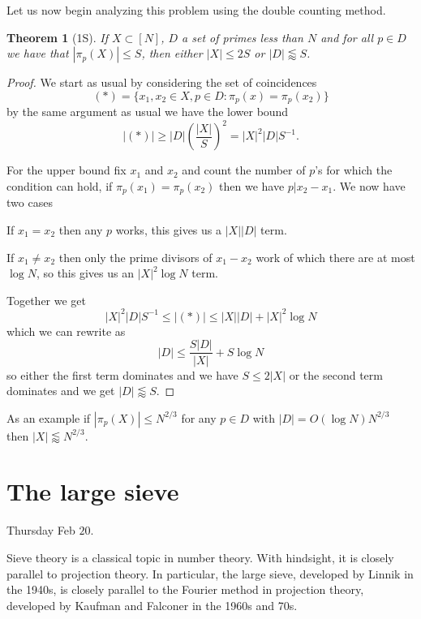 \documentclass[12pt]{amsart}
\newtheorem{theorem}{Theorem}[section]
\begin{document}
Let us now begin analyzing this problem using the double counting method.
\begin{theorem}[1S]
    If $X \subset [N]$, $D$ a set of primes less than $N$ and for all $p \in D$ we have that $|\pi_p(X)| \leq S$, then either $|X| \leq 2 S$ or $|D| \lessapprox S$.
\end{theorem}
\begin{proof}
    We start as usual by considering the set of coincidences
    \[
        (*) = \{x_1,x_2 \in X, p \in D : \pi_p (x) = \pi_p (x_2) \}
    \]
    by the same argument as usual we have the lower bound
    \[
        |(*)| \geq |D| \left(\frac{|X|}{S}\right)^2 = |X|^2 |D| S^{-1}.
    \]

    For the upper bound fix $x_1$ and $x_2$ and count the number of $p$'s for which the condition can hold, if $\pi_p (x_1) = \pi_p (x_2)$ then we have $p | x_2 - x_1$. We now have two cases

    If $x_1 = x_2$ then any $p$ works, this gives us a $|X||D|$ term.

    If $x_1 \neq x_2$ then only the prime divisors of $x_1 - x_2$ work of which there are at most $\log N$, so this gives us an $|X|^2 \log N$ term.

    Together we get
    \[
        |X|^2 |D| S^{-1} \leq |(*)| \leq |X||D| + |X|^2 \log N
    \]
    which we can rewrite as
    \[
        |D| \leq \frac{S |D|}{|X|} + S \log N
    \]
    so either the first term dominates and we have $S \leq 2 |X|$ or the second term dominates and we get $|D| \lessapprox S$.
\end{proof}
As an example if $|\pi_p (X)| \leq N^{2/3}$ for any $p \in D$ with $|D| = O(\log N) N^{2/3}$ then $|X| \lessapprox N^{2/3}$. %

\newpage

\section{The large sieve}


Thursday Feb $20$. %

Sieve theory is a classical topic in number theory.   With hindsight,  it is closely parallel to projection theory.   In particular,  the large sieve,  developed by Linnik in the 1940s,  is closely parallel to the Fourier method in projection theory,  developed by Kaufman and Falconer in the 1960s and 70s.
\end{document}

